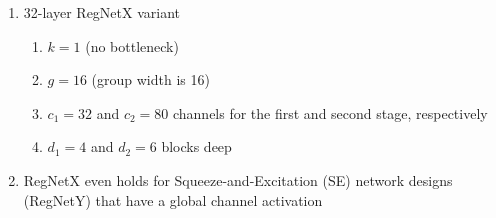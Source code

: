 \begin{enumerate}[itemsep=0.15cm]
    \item 32-layer RegNetX variant
    \begin{enumerate}
        \item $k = 1$ (no bottleneck)
        \item $g = 16$ (group width is 16)
        \item $c_1 = 32$ and $c_2 = 80$ channels for the first and second stage, respectively
        \item $d_1=4$ and $d_2=6$ blocks deep

    \end{enumerate}

    \item RegNetX even holds for Squeeze-and-Excitation (SE) network designs (RegNetY) that have a global channel activation

\end{enumerate}

















































































































